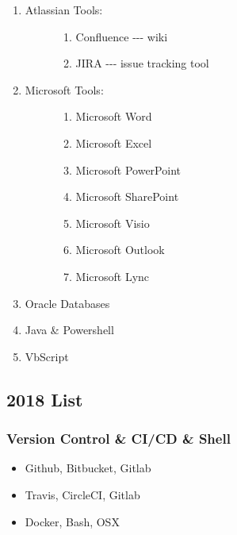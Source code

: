 \begin{enumerate}
\def\labelenumi{\arabic{enumi}.}
\item
  \begin{description}
  \item[Atlassian Tools:]
  \begin{enumerate}
  \def\labelenumii{\arabic{enumii}.}
  \tightlist
  \item
    Confluence -\/-\/- wiki
  \item
    JIRA -\/-\/- issue tracking tool
  \end{enumerate}
  \end{description}
\item
  \begin{description}
  \item[Microsoft Tools:]
  \begin{enumerate}
  \def\labelenumii{\arabic{enumii}.}
  \tightlist
  \item
    Microsoft Word
  \item
    Microsoft Excel
  \item
    Microsoft PowerPoint
  \item
    Microsoft SharePoint
  \item
    Microsoft Visio
  \item
    Microsoft Outlook
  \item
    Microsoft Lync
  \end{enumerate}
  \end{description}
\item
  Oracle Databases
\item
  Java \& Powershell
\item
  VbScript
\end{enumerate}


\subsection{2018 List}\label{list}


\subsubsection{Version Control \& CI/CD \&
Shell}\label{version-control-cicd-shell}

\begin{itemize}
\tightlist
\item
  Github, Bitbucket, Gitlab
\item
  Travis, CircleCI, Gitlab
\item
  Docker, Bash, OSX
\end{itemize}


